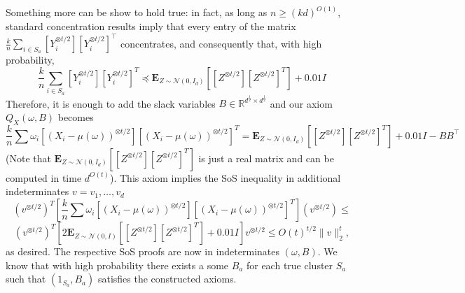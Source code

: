 \documentclass[12pt]{article}%
\newcommand{\expect}{\mathbf{E}}
\begin{document}
\noindent
Something more can be show to hold true: in fact, as long as $n \geq (kd)^{O(1)}$, standard concentration results imply that every entry of the matrix $\tfrac k n \sum_{i \in S_a} \left [ Y_i^{\otimes t/2} \right ] \left [ Y_i^{\otimes t/2} \right ]^\top$ concentrates, and consequently that, with high probability,
$$
\frac{k}{n}
\sum_{i \in S_a}
\left[Y_i^{\otimes t/2}\right]
\left[Y_i^{\otimes t/2}\right]^T \preceq 
 \expect_{Z \sim \mathcal{N}(0,I_d)} \left[
\left[Z^{\otimes t/2}\right]
\left[Z^{\otimes t/2}\right]^T \right] + 0.01 I
$$
Therefore, it is enough to add the slack variables 
$B \in \mathbb{R}^{d^{\frac{t}{2}}\times d^{\frac{t}{2}}}$ and our axiom $Q_X(\omega, B)$ becomes
$$
\frac{k}{n}
\sum \omega_i
\left[(X_i - \mu(\omega))^{\otimes t/2}\right]
\left[(X_i - \mu(\omega))^{\otimes t/2}\right]^T  =
\expect_{Z \sim \mathcal{N}(0,I_d)} \left[
\left[Z^{\otimes t/2}\right]
\left[Z^{\otimes t/2}\right]^T \right] + 0.01 I - BB^\top
$$
(Note that $\expect_{Z \sim \mathcal{N}(0,I_d)} \left[
\left[Z^{\otimes t/2}\right]
\left[Z^{\otimes t/2}\right]^T \right]$
is just a real matrix and can be computed in time $d^{O(t)}$).
This axiom implies the SoS inequality in additional indeterminates $v = v_1,\ldots,v_d$
$$
(v^{\otimes t/2})^T
\left[
\frac{k}{n}
\sum \omega_i
\left[(X_i - \mu(\omega))^{\otimes t/2}\right]
\left[(X_i - \mu(\omega))^{\otimes t/2}\right]^T
\right]
(v^{\otimes t/2})
\le $$
$$
(v^{\otimes t/2})^T \left[2 \expect_{Z \sim \mathcal{N}(0,I)} \left[
\left[Z^{\otimes t/2}\right]
\left[Z^{\otimes t/2}\right]^T \right] + 0.01 I\right] 
v^{\otimes t/2}\le 
O(t)^{t/2} \|v\|_2^t,
$$
as desired. The respective SoS proofs are now in indeterminates $(\omega, B).$ We know that with high probability there exists a some $B_a$ for each true cluster 
$S_a$ such that $(1_{S_a}, B_a)$ satisfies the constructed axioms. 

\printbibliography

\appendix
\end{document}
